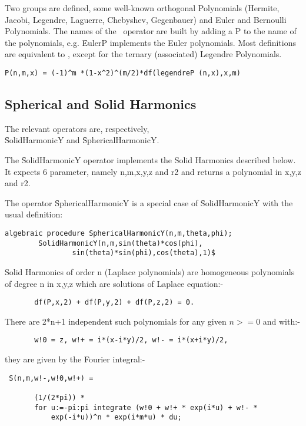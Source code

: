Two groups are defined, some well-known orthogonal Polynomials
(Hermite, Jacobi, Legendre, Laguerre, Chebyshev, Gegenbauer)
and Euler and Bernoulli Polynomials.
The names of the \REDUCE\  operator are built by adding a P
to the name
of the polynomials, e.g. \f{EulerP} implements the Euler polynomials.
Most definitions are equivalent to \cite{Abramowitz:72}, except
for the ternary (associated) Legendre Polynomials.

\begin{verbatim}
P(n,m,x) = (-1)^m *(1-x^2)^(m/2)*df(legendreP (n,x),x,m)
\end{verbatim}

\subsection{Spherical and Solid Harmonics}
 
 
The relevant operators are, respectively,\\
\f{SolidHarmonicY} and \f{SphericalHarmonicY}.

The \f{SolidHarmonicY} operator implements the Solid Harmonics
described below. It expects 6 parameter, namely n,m,x,y,z and r2
and returns a polynomial in x,y,z and r2.

The operator
\f{SphericalHarmonicY} is a special case of \f{SolidHarmonicY}
with the usual definition:

\begin{verbatim}
algebraic procedure SphericalHarmonicY(n,m,theta,phi);
        SolidHarmonicY(n,m,sin(theta)*cos(phi),
                sin(theta)*sin(phi),cos(theta),1)$
\end{verbatim}


Solid Harmonics of order n (Laplace polynomials)
are homogeneous polynomials of degree n in x,y,z
which are solutions of Laplace equation:-

\begin{verbatim}
       df(P,x,2) + df(P,y,2) + df(P,z,2) = 0.
\end{verbatim}

There are 2*n+1 independent such polynomials for any given $n >=0$
and with:-

\begin{verbatim}
       w!0 = z, w!+ = i*(x-i*y)/2, w!- = i*(x+i*y)/2,
\end{verbatim}

they are given by the Fourier integral:-

\begin{verbatim}
 S(n,m,w!-,w!0,w!+) =

       (1/(2*pi)) *
       for u:=-pi:pi integrate (w!0 + w!+ * exp(i*u) + w!- *
           exp(-i*u))^n * exp(i*m*u) * du;
\end{verbatim}

